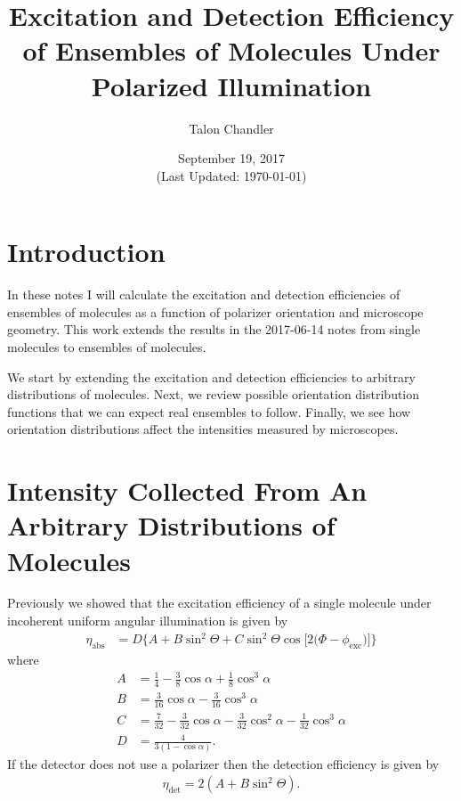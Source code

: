 \documentclass[11pt]{article}
\begin{document}
\title{\vspace{-2.5em} Excitation and Detection Efficiency of Ensembles of
  Molecules Under Polarized Illumination \vspace{-1em}} \author{Talon
  Chandler}%
\date{\vspace{-1em}September 19, 2017\\ (Last Updated: \today)\vspace{-1em}}
\maketitle
\section{Introduction}
In these notes I will calculate the excitation and detection efficiencies of
ensembles of molecules as a function of polarizer orientation and microscope
geometry. This work extends the results in the 2017-06-14 notes from single
molecules to ensembles of molecules.

We start by extending the excitation and detection efficiencies to arbitrary
distributions of molecules. Next, we review possible orientation distribution
functions that we can expect real ensembles to follow. Finally, we see how
orientation distributions affect the intensities measured by microscopes.

\section{Intensity Collected From An Arbitrary Distributions of Molecules}
Previously we showed that the excitation efficiency of a single molecule under
incoherent uniform angular illumination is given by
\begin{align}
  \eta_{\text{abs}} &= D\{A + B\sin^{2}{\Theta} + C\sin^{2}{\Theta} \cos{[2 (\Phi - \phi_{\text{exc}}})]\}\label{eq:scalarabs}
\end{align}
where
\begin{subequations}
\begin{align}
  A &= \frac{1}{4} - \frac{3}{8} \cos{\alpha } + \frac{1}{8} \cos^{3}{\alpha }\\
  B &= \frac{3}{16} \cos{\alpha } - \frac{3}{16} \cos^{3}{\alpha }\\
  C &= \frac{7}{32} - \frac{3}{32} \cos{\alpha } - \frac{3}{32} \cos^{2}{\alpha } - \frac{1}{32} \cos^{3}{\alpha}\\
  D &= \frac{4}{3(1 - \cos\alpha)}.
\end{align}\label{eq:coefficients}%
\end{subequations}
If the detector does not use a polarizer then the detection efficiency is given by
\begin{align}
  \eta_{\text{det}} = 2(A + B\sin^2\Theta).
\end{align}
\end{document}
